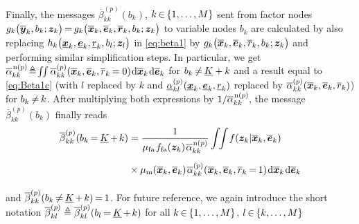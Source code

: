 \documentclass[10pt, twoside, romanappendices]{IEEEtran}
\providecommand{\ist}{\hspace*{.3mm}}
\providecommand{\rmv}{\hspace*{-.3mm}}
\providecommand{\nn}{\nonumber}
\begin{document}
Finally, the messages $\overline{\beta}_{kk}^{(p)}(b_{k})$, $k \rmv\in\rmv \{1,\dots,M\}$ sent from factor nodes $g_k\big( \overline{\V{y}}_{k}, b_{k}; \V{z}_{k} \big) \rmv=\rmv g_k\big( \overline{\V{x}}_{k}, \overline{\V{e}}_{k}, \overline{\V{r}}_{k}, b_{k}; \V{z}_{k} \big)$ to variable nodes $b_k$ are calculated by also replacing $h_k\big( \underline{\bm{x}}_{k},  \underline{\bm{e}}_{k}, \underline{r}_{k}, b_{l}; \bm{z}_l \big)$ in \eqref{eq:beta1} by $g_k\big( \overline{\bm{x}}_{k}, \overline{\bm{e}}_{k}, \overline{r}_k, b_{k}; \bm{z}_{k} \big)$ and  performing \vspace{-.2mm}similar simplification steps. In particular, we get $\overline{\alpha}_{kk}^{\ist\mathrm{n}(p)} \rmv\rmv\triangleq\rmv\rmv  \int \rmv\rmv\rmv\rmv \int \overline{\alpha}_{kk}^{(p)}(\overline{\V{x}}_{k},\overline{\V{e}}_{k},\overline{r}_{k} \rmv= 0) \ist \mathrm{d} \overline{\V{x}}_{k} \ist \mathrm{d} \overline{\V{e}}_{k}$ for $b_{k} \rmv\neq\rmv \underline{K}+k$ and a result equal to \eqref{eq:Beta1c} (with $l$ replaced by $k$ and $\underline{\alpha}_{kl}^{(p)}(\underline{\bm{x}}_{k},\underline{\bm{e}}_{k},\underline{r}_{k})$ replaced by  \vspace{1mm} $\overline{\alpha}_{kk}^{(p)}(\overline{\bm{x}}_{k},\overline{\bm{e}}_{k},\overline{r}_{k})$) for $b_{k} \rmv\neq\rmv k$. After \vspace{-1mm} multiplying both expressions by $1/\overline{\alpha}_{kk}^{\ist \mathrm{n}(p)}\rmv$, the message $\overline{\beta}_{kk}^{(p)}(b_{k})$ finally reads
\begin{align}
\overline{\beta}_{kk}^{(p)}(b_{k} \rmv=\rmv \underline{K} \rmv+\rmv k)  &= \frac{1}{\mu_{\mathrm{fa}} \ist f_{\mathrm{fa}}(\V{z}_{k}) \ist \overline{\alpha}_{kk}^{ \ist \mathrm{n}(p)}}  \int \rmv\rmv\rmv\rmv \int \rmv f(\V{z}_{k}| \overline{\V{x}}_k, \overline{\V{e}}_{k})   \nn\\[2mm]
&\hspace{0mm}\times\mu_{\mathrm{m}}(\overline{\V{x}}_k,\overline{\V{e}}_k) \ist \overline{\alpha}_{kk}^{(p)}(\overline{\V{x}}_{k}, \overline{\V{e}}_{k}, \overline{r}_{k} \rmv=\rmv 1) \ist \mathrm{d} \overline{\V{x}}_{k} \ist \mathrm{d} \overline{\V{e}}_{k} \nn\\[1mm]
\label{eq:Beta1d} \\[-9mm]
\nn
\end{align}
and $\overline{\beta}_{kk}^{(p)}(b_{k} \rmv\neq\rmv \underline{K} \rmv+\rmv k) \rmv=\rmv 1$. For future reference, we again introduce the short notation $\overline{\beta}_{kl}^{(p)} \triangleq \overline{\beta}_{kl}^{(p)}(b_{l} \rmv=\rmv \underline{K} \rmv+\rmv k)$ for all $k \rmv\in\rmv \{1,\dots,M\}$, $l \rmv\in\rmv \{k,\dots,M\}$
\end{document}
